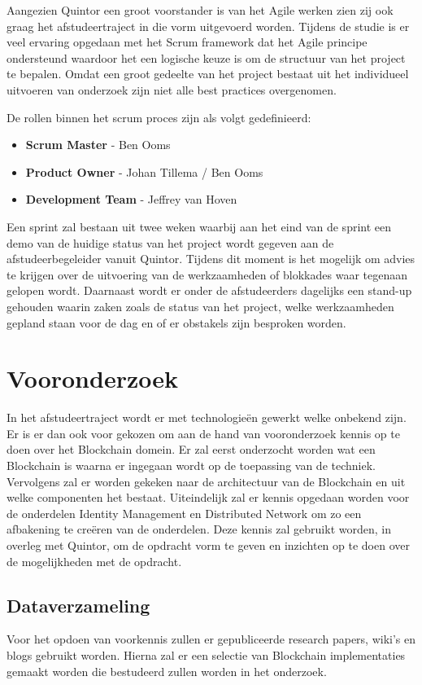 Aangezien Quintor een groot voorstander is van het Agile werken zien zij ook graag het afstudeertraject in die vorm uitgevoerd worden. Tijdens de studie is er veel ervaring opgedaan met het Scrum framework dat het Agile principe ondersteund waardoor het een logische keuze is om de structuur van het project te bepalen. Omdat een groot gedeelte van het project bestaat uit het individueel uitvoeren van onderzoek zijn niet alle best practices overgenomen. 

De rollen binnen het scrum proces \citep{schwaber2011scrum} zijn als volgt gedefinieerd:
\begin{itemize}[noitemsep]
  \item \textbf{Scrum Master} - Ben Ooms
  \item \textbf{Product Owner} - Johan Tillema / Ben Ooms
  \item \textbf{Development Team} - Jeffrey van Hoven
\end{itemize}

Een sprint zal bestaan uit twee weken waarbij aan het eind van de sprint een demo van de huidige status van het project wordt gegeven aan de afstudeerbegeleider vanuit Quintor. Tijdens dit moment is het mogelijk om advies te krijgen over de uitvoering van de werkzaamheden of blokkades waar tegenaan gelopen wordt. Daarnaast wordt er onder de afstudeerders dagelijks een stand-up gehouden waarin zaken zoals de status van het project, welke werkzaamheden gepland staan voor de dag en of er obstakels zijn besproken worden.

\newpage
\section{Vooronderzoek} In het afstudeertraject wordt er met technologieën gewerkt welke onbekend zijn. Er is er dan ook voor gekozen om aan de hand van vooronderzoek kennis op te doen over het Blockchain domein. Er zal eerst onderzocht worden wat een Blockchain is waarna er ingegaan wordt op de toepassing van de techniek. Vervolgens zal er worden gekeken naar de architectuur van de Blockchain en uit welke componenten het bestaat. Uiteindelijk zal er kennis opgedaan worden voor de onderdelen Identity Management en Distributed Network om zo een afbakening te creëren van de onderdelen. Deze kennis zal gebruikt worden, in overleg met Quintor, om de opdracht vorm te geven en inzichten op te doen over de mogelijkheden met de opdracht. 

\subsection{Dataverzameling}
Voor het opdoen van voorkennis zullen er gepubliceerde research papers, wiki’s en blogs gebruikt worden. Hierna zal er een selectie van Blockchain implementaties gemaakt worden die bestudeerd zullen worden in het onderzoek.

